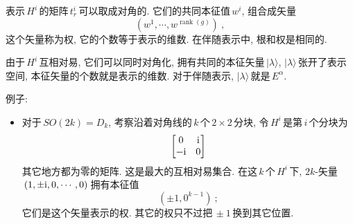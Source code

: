 表示$\,H^{i}\,$的矩阵$\,t_{r}^{i}\,$可以取成对角的. 它们的共同本征值$\,w^{i}$, 组合成矢量
\begin{equation}
    (w^{1},\cdots, w^{\operatorname{rank}(g)}) \:, \label{11.4.13}
\end{equation}
这个矢量称为权, 它的个数等于表示的维数. 在伴随表示中, 根和权是相同的.
\begin{tcolorbox}
由于$\,H^{i}\,$互相对易, 它们可以同时对角化, 拥有共同的本征矢量$\,\lvert\lambda\rangle$, $\lvert\lambda\rangle\,$张开了表示空间, 本征矢量的个数就是表示的维数. 对于伴随表示, $\lvert\lambda\rangle\,$就是$\,E^{\alpha}$.
\end{tcolorbox}

\noindent 例子:
\begin{itemize}
    \item 对于$\,SO(2k)=D_{k}$, 考察沿着对角线的$\,k\,$个$\,2\times2\,$分块, 令$\,H^{i}\,$是第$\,i\,$个分块为
    \begin{equation}
        \begin{bmatrix}
        0 & \mathrm{i} \\ -\mathrm{i} & 0
        \end{bmatrix}  \label{11.4.14}
    \end{equation}
    其它地方都为零的矩阵. 这是最大的互相对易集合. 在这$\,k\,$个$\,H^{i}\,$下, $2k$-矢量$\,(1,\pm\mathrm{i},0,\cdots,0)\,$拥有本征值
    \begin{equation}
    (\pm 1, 0^{k-1}) \:; \label{11.4.15}
    \end{equation}
    它们是这个矢量表示的权. 其它的权只不过把$\,\pm1\,$换到其它位置.
    

\end{itemize}

